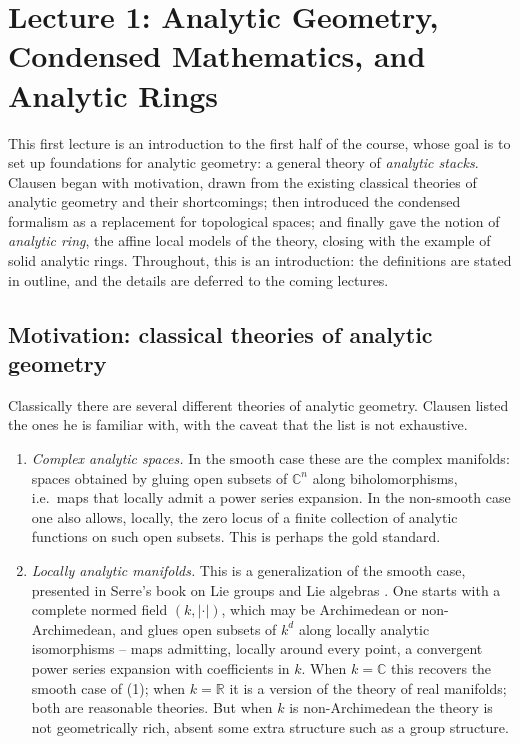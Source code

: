 \section{Lecture 1: Analytic Geometry, Condensed Mathematics, and Analytic Rings}
\label{lec:1}

This first lecture is an introduction to the first half of the course, whose
goal is to set up foundations for analytic geometry: a general theory of
\emph{analytic stacks}. Clausen began with motivation, drawn from the existing
classical theories of analytic geometry and their shortcomings; then introduced
the condensed formalism as a replacement for topological spaces; and finally
gave the notion of \emph{analytic ring}, the affine local models of the theory,
closing with the example of solid analytic rings. Throughout, this is an
introduction: the definitions are stated in outline, and the details are
deferred to the coming lectures.

\subsection{Motivation: classical theories of analytic geometry}

Classically there are several different theories of analytic geometry. Clausen
listed the ones he is familiar with, with the caveat that the list is not
exhaustive.

\begin{enumerate}
\item \emph{Complex analytic spaces.} In the smooth case these are the complex
manifolds: spaces obtained by gluing open subsets of $\mathbb{C}^n$ along
biholomorphisms, i.e.\ maps that locally admit a power series expansion. In the
non-smooth case one also allows, locally, the zero locus of a finite collection
of analytic functions on such open subsets. This is perhaps the gold standard.

\item \emph{Locally analytic manifolds.} This is a generalization of the smooth
case, presented in Serre's book on Lie groups and Lie algebras
\cite{Serre_1992}. One starts with a complete normed field $(k,\lvert\cdot\rvert)$,
which may be Archimedean or non-Archimedean, and glues open subsets of $k^d$
along locally analytic isomorphisms -- maps admitting, locally around every
point, a convergent power series expansion with coefficients in $k$. When
$k=\mathbb{C}$ this recovers the smooth case of (1); when $k=\mathbb{R}$ it is a
version of the theory of real manifolds; both are reasonable theories. But when
$k$ is non-Archimedean the theory is not geometrically rich, absent some extra
structure such as a group structure.
\end{enumerate}

